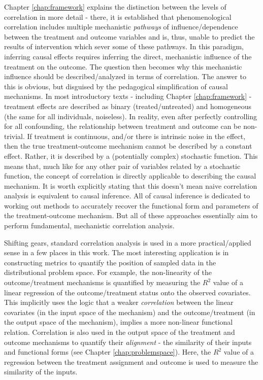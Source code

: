 \documentclass[./main.tex]{subfiles}
\begin{document}
\vspace{\baselineskip}

Chapter \ref{chap:framework} explains the distinction between the levels of correlation in more detail - there, it is established that phenomenological correlation includes multiple mechanistic \textit{pathways} of influence/dependence between the treatment and outcome variables and is, thus, unable to predict the results of intervention which sever some of these pathways. In this paradigm, inferring causal effects requires inferring the direct, mechanistic influence of the treatment on the outcome. The question then becomes why this mechanistic influence should be described/analyzed in terms of correlation. The answer to this is obvious, but disguised by the pedagogical simplification of causal mechanisms. In most introductory texts - including Chapter \ref{chap:framework} - treatment effects are described as binary (treated/untreated) and homogeneous (the same for all individuals, noiseless). In reality, even after perfectly controlling for all confounding, the relationship between treatment and outcome can be non-trivial. If treatment is continuous, and/or there is intrinsic noise in the effect, then the true treatment-outcome mechanism cannot be described by a constant effect. Rather, it is described by a (potentially complex) stochastic function. This means that, much like for any other pair of variables related by a stochastic function, the concept of correlation is directly applicable to describing the causal mechanism. It is worth explicitly stating that this doesn't mean naive correlation analysis is equivalent to causal inference. All of causal inference is dedicated to working out methods to accurately recover the functional form and parameters of the treatment-outcome mechanism. But all of these approaches essentially aim to perform fundamental, mechanistic correlation analysis.

\vspace{\baselineskip}

Shifting gears, standard correlation analysis is used in a more practical/applied sense in a few places in this work. The most interesting application is in constructing metrics to quantify the position of sampled data in the distributional problem space. For example, the non-linearity of the outcome/treatment mechanisms is quantified by measuring the $R^2$ value of a linear regression of the outcome/treatment status onto the observed covariates. This implicitly uses the logic that a weaker \textit{correlation} between the linear covariates (in the input space of the mechanism) and the outcome/treatment (in the output space of the mechanism), implies a more non-linear functional relation. Correlation is also used in the output space of the treatment and outcome mechanisms to quantify their \textit{alignment} - the similarity of their inputs and functional forms (see Chapter \ref{chap:problemspace}). Here, the $R^2$ value of a regression between the treatment assignment and outcome is used to measure the similarity of the inputs.
\end{document}
